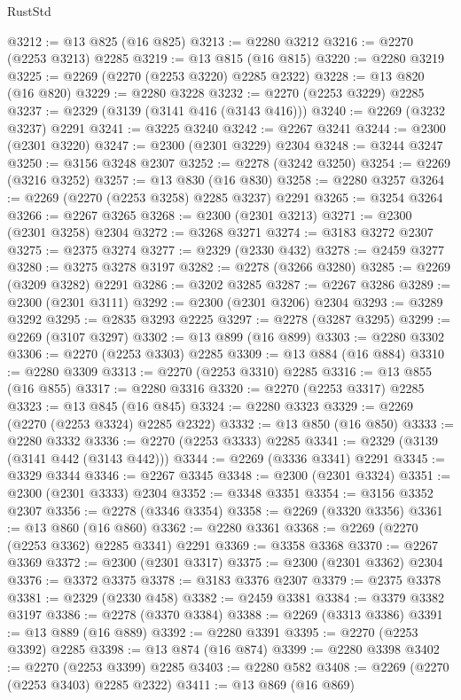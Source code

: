 \begin{lexlean}{RustStd}
\begin{coremodule}
@3212 := @13 @825 (@16 @825)
@3213 := @2280 @3212
@3216 := @2270 (@2253 @3213) @2285
@3219 := @13 @815 (@16 @815)
@3220 := @2280 @3219
@3225 := @2269 (@2270 (@2253 @3220) @2285 @2322)
@3228 := @13 @820 (@16 @820)
@3229 := @2280 @3228
@3232 := @2270 (@2253 @3229) @2285
@3237 := @2329 (@3139 (@3141 @416 (@3143 @416)))
@3240 := @2269 (@3232 @3237) @2291
@3241 := @3225 @3240
@3242 := @2267 @3241
@3244 := @2300 (@2301 @3220)
@3247 := @2300 (@2301 @3229) @2304
@3248 := @3244 @3247
@3250 := @3156 @3248 @2307
@3252 := @2278 (@3242 @3250)
@3254 := @2269 (@3216 @3252)
@3257 := @13 @830 (@16 @830)
@3258 := @2280 @3257
@3264 := @2269 (@2270 (@2253 @3258) @2285 @3237) @2291
@3265 := @3254 @3264
@3266 := @2267 @3265
@3268 := @2300 (@2301 @3213)
@3271 := @2300 (@2301 @3258) @2304
@3272 := @3268 @3271
@3274 := @3183 @3272 @2307
@3275 := @2375 @3274
@3277 := @2329 (@2330 @432)
@3278 := @2459 @3277
@3280 := @3275 @3278 @3197
@3282 := @2278 (@3266 @3280)
@3285 := @2269 (@3209 @3282) @2291
@3286 := @3202 @3285
@3287 := @2267 @3286
@3289 := @2300 (@2301 @3111)
@3292 := @2300 (@2301 @3206) @2304
@3293 := @3289 @3292
@3295 := @2835 @3293 @2225
@3297 := @2278 (@3287 @3295)
@3299 := @2269 (@3107 @3297)
@3302 := @13 @899 (@16 @899)
@3303 := @2280 @3302
@3306 := @2270 (@2253 @3303) @2285
@3309 := @13 @884 (@16 @884)
@3310 := @2280 @3309
@3313 := @2270 (@2253 @3310) @2285
@3316 := @13 @855 (@16 @855)
@3317 := @2280 @3316
@3320 := @2270 (@2253 @3317) @2285
@3323 := @13 @845 (@16 @845)
@3324 := @2280 @3323
@3329 := @2269 (@2270 (@2253 @3324) @2285 @2322)
@3332 := @13 @850 (@16 @850)
@3333 := @2280 @3332
@3336 := @2270 (@2253 @3333) @2285
@3341 := @2329 (@3139 (@3141 @442 (@3143 @442)))
@3344 := @2269 (@3336 @3341) @2291
@3345 := @3329 @3344
@3346 := @2267 @3345
@3348 := @2300 (@2301 @3324)
@3351 := @2300 (@2301 @3333) @2304
@3352 := @3348 @3351
@3354 := @3156 @3352 @2307
@3356 := @2278 (@3346 @3354)
@3358 := @2269 (@3320 @3356)
@3361 := @13 @860 (@16 @860)
@3362 := @2280 @3361
@3368 := @2269 (@2270 (@2253 @3362) @2285 @3341) @2291
@3369 := @3358 @3368
@3370 := @2267 @3369
@3372 := @2300 (@2301 @3317)
@3375 := @2300 (@2301 @3362) @2304
@3376 := @3372 @3375
@3378 := @3183 @3376 @2307
@3379 := @2375 @3378
@3381 := @2329 (@2330 @458)
@3382 := @2459 @3381
@3384 := @3379 @3382 @3197
@3386 := @2278 (@3370 @3384)
@3388 := @2269 (@3313 @3386)
@3391 := @13 @889 (@16 @889)
@3392 := @2280 @3391
@3395 := @2270 (@2253 @3392) @2285
@3398 := @13 @874 (@16 @874)
@3399 := @2280 @3398
@3402 := @2270 (@2253 @3399) @2285
@3403 := @2280 @582
@3408 := @2269 (@2270 (@2253 @3403) @2285 @2322)
@3411 := @13 @869 (@16 @869)

\end{coremodule}
\end{lexlean}
